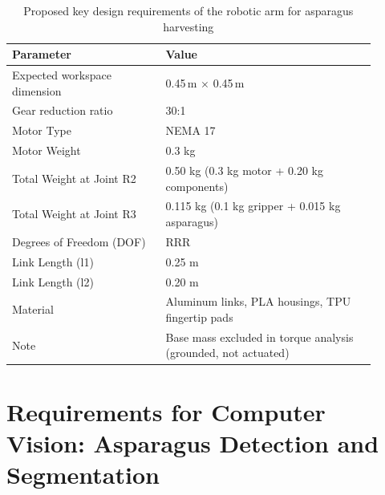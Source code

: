 \begingroup\small
\begin{table}[h!]
\centering
\caption{Proposed key design requirements of the robotic arm for asparagus harvesting}
\label{tab:robotic_arm_specs}
\begin{tabular}{|p{0.38\linewidth}|p{0.52\linewidth}|}
\hline
\textbf{Parameter} & \textbf{Value} \\ \hline
Expected workspace dimension & 0.45\,m $\times$ 0.45\,m \\ \hline
Gear reduction ratio & 30:1 \\ \hline
Motor Type & NEMA 17 \\ \hline
Motor Weight & 0.3 kg \\ \hline
Total Weight at Joint R2 & 0.50 kg (0.3 kg motor + 0.20 kg components) \\ \hline
Total Weight at Joint R3 & 0.115 kg (0.1 kg gripper + 0.015 kg asparagus) \\ \hline
Degrees of Freedom (DOF) & RRR \\ \hline
Link Length (l1) & 0.25 m \\ \hline
Link Length (l2) & 0.20 m \\ \hline
Material &  Aluminum links, PLA housings, TPU fingertip pads\\ \hline
Note & Base mass excluded in torque analysis (grounded, not actuated) \\ \hline
\end{tabular}
\end{table}
\endgroup









\section{Requirements for Computer Vision: Asparagus Detection and Segmentation}


